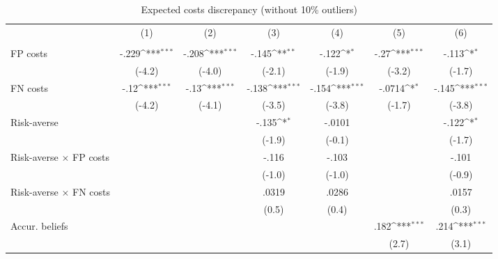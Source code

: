 \begin{table}[htbp]\centering
\def\sym#1{\ifmmode^{#1}\else\(^{#1}\)\fi}
\caption{Expected costs discrepancy (without 10\% outliers)}
\begin{tabular}{l*{6}{c}}
\hline\hline
                &\multicolumn{1}{c}{(1)}&\multicolumn{1}{c}{(2)}&\multicolumn{1}{c}{(3)}&\multicolumn{1}{c}{(4)}&\multicolumn{1}{c}{(5)}&\multicolumn{1}{c}{(6)}\\
                &\multicolumn{1}{c}{}&\multicolumn{1}{c}{}&\multicolumn{1}{c}{}&\multicolumn{1}{c}{}&\multicolumn{1}{c}{}&\multicolumn{1}{c}{}\\
\hline
FP costs        &    -.229\sym{***}&    -.208\sym{***}&    -.145\sym{**} &    -.122\sym{*}  &     -.27\sym{***}&    -.113\sym{*}  \\
                &   (-4.2)         &   (-4.0)         &   (-2.1)         &   (-1.9)         &   (-3.2)         &   (-1.7)         \\
FN costs        &     -.12\sym{***}&     -.13\sym{***}&    -.138\sym{***}&    -.154\sym{***}&   -.0714\sym{*}  &    -.145\sym{***}\\
                &   (-4.2)         &   (-4.1)         &   (-3.5)         &   (-3.8)         &   (-1.7)         &   (-3.8)         \\
Risk-averse     &                  &                  &    -.135\sym{*}  &   -.0101         &                  &    -.122\sym{*}  \\
                &                  &                  &   (-1.9)         &   (-0.1)         &                  &   (-1.7)         \\
Risk-averse $\times$ FP costs&                  &                  &    -.116         &    -.103         &                  &    -.101         \\
                &                  &                  &   (-1.0)         &   (-1.0)         &                  &   (-0.9)         \\
Risk-averse $\times$ FN costs&                  &                  &    .0319         &    .0286         &                  &    .0157         \\
                &                  &                  &    (0.5)         &    (0.4)         &                  &    (0.3)         \\
Accur. beliefs  &                  &                  &                  &                  &     .182\sym{***}&     .214\sym{***}\\
                &                  &                  &                  &                  &    (2.7)         &    (3.1)         \\

\end{tabular}
\end{table}
